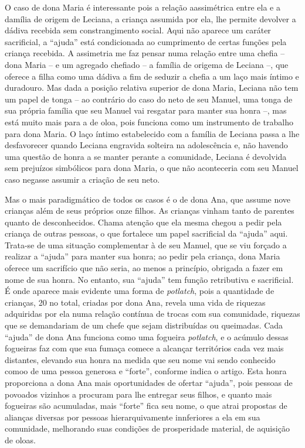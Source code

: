O caso de dona Maria é interessante pois a relação aassimétrica entre ela e a damília de origem de Leciana, a criança assumida por ela, lhe permite devolver a dádiva recebida sem constrangimento social.
Aqui não aparece um caráter sacrificial, a \enquote{ajuda} está condicionada ao cumprimento de certas funções pela criança recebida.
A assimetria me faz pensar numa relação entre uma chefia -- dona Maria -- e um agregado chefiado -- a família de origema de Leciana --, que oferece a filha como uma dádiva a fim de seduzir a chefia a um laço mais íntimo e duradouro.
Mas dada a posição relativa superior de dona Maria, Leciana não tem um papel de tonga -- ao contrário do caso do neto de seu Manuel, uma tonga de sua própria família que seu Manuel vai resgatar para manter sua honra --, mas está muito mais para a de oloa, pois funciona como um instrumento de trabalho para dona Maria.
O laço íntimo estabelecido com a família de Leciana passa a lhe desfavorecer quando Leciana engravida solteira na adolescência e, não havendo uma questão de honra a se manter perante a comunidade, Leciana é devolvida sem prejuízos simbólicos para dona Maria, o que não aconteceria com seu Manuel caso negasse assumir a criação de seu neto.

Mas o mais paradigmático de todos os casos é o de dona Ana, que assume nove crianças além de seus próprios onze filhos.
As crianças vinham tanto de parentes quanto de desconhecidos.
Chama atenção que ela mesma chegou a pedir pela criança de outras pessoas, o que fortalece um papel sacrificial da \enquote{ajuda} aqui.
Trata-se de uma situação complementar à de seu Manuel, que se viu forçado a realizar a \enquote{ajuda} para manter sua honra;
ao pedir pela criança, dona Maria oferece um sacrifício que não seria, ao menos a princípio, obrigada a fazer em nome de sua honra.
No entanto, sua \enquote{ajuda} tem função retributiva e sacrificial.
É onde aparece mais evidente uma forma de \textit{potlatch}, pois a quantidade de crianças, 20 no total, criadas por dona Ana, revela uma vida de riquezas adquiridas por ela numa relação contínua de trocas com sua comunidade, riquezas que se demandariam de um chefe que sejam distribuídas ou queimadas.
Cada \enquote{ajuda} de dona Ana funciona como uma fogueira \textit{potlatch}, e o acúmulo dessas fogueiras faz com que sua fumaça comece a alcançar territórios cada vez mais distantes, elevando sua honra na medida que seu nome vai sendo conhecido comoo de uma pessoa generosa e \enquote{forte}, conforme indica o artigo.
Esta honra proporciona a dona Ana mais oportunidades de ofertar \enquote{ajuda}, pois pessoas de povoados vizinhos a procuram para lhe entregar seus filhos, e quanto mais fogueiras são acumuladas, mais \enquote{forte} fica seu nome, o que atrai propostas de alianças diversas por pessoas hierarquivamente innferiores a ela em sua comunidade, melhorando suas condições de prosperidade material, de aquisição de oloas.

